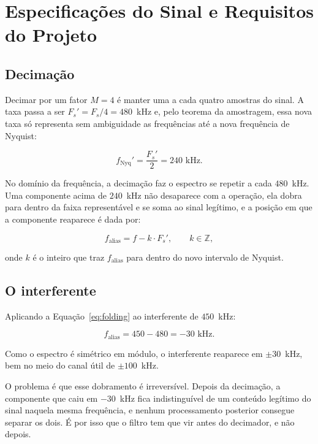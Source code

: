 \chapter{Especificações do Sinal e Requisitos do Projeto}
\label{cap:desenvolvimento}

\section{Decimação}

Decimar por um fator $M = 4$ é manter uma a cada quatro amostras do sinal. A taxa passa a ser $F_s' = F_s/4 = 480$~kHz e, pelo teorema da amostragem, essa nova taxa só representa sem ambiguidade as frequências até a nova frequência de Nyquist:

\begin{equation}
f_{\mathrm{Nyq}}' = \frac{F_s'}{2} = 240 \text{ kHz}.
\end{equation}

No domínio da frequência, a decimação faz o espectro se repetir a cada $480$~kHz. Uma componente acima de $240$~kHz não desaparece com a operação, ela dobra para dentro da faixa representável e se soma ao sinal legítimo, e a posição em que a componente reaparece é dada por:

\begin{equation}
f_{\mathrm{alias}} = f - k \cdot F_s', \qquad k \in \mathbb{Z},
\label{eq:folding}
\end{equation}

onde $k$ é o inteiro que traz $f_{\mathrm{alias}}$ para dentro do novo intervalo de Nyquist.

\section{O interferente}

Aplicando a Equação~\eqref{eq:folding} ao interferente de $450$~kHz:

\begin{equation}
f_{\mathrm{alias}} = 450 - 480 = -30 \text{ kHz}.
\end{equation}

Como o espectro é simétrico em módulo, o interferente reaparece em $\pm 30$~kHz, bem no meio do canal útil de $\pm 100$~kHz.

O problema é que esse dobramento é irreversível. Depois da decimação, a componente que caiu em $-30$~kHz fica indistinguível de um conteúdo legítimo do sinal naquela mesma frequência, e nenhum processamento posterior consegue separar os dois. É por isso que o filtro tem que vir antes do decimador, e não depois.


